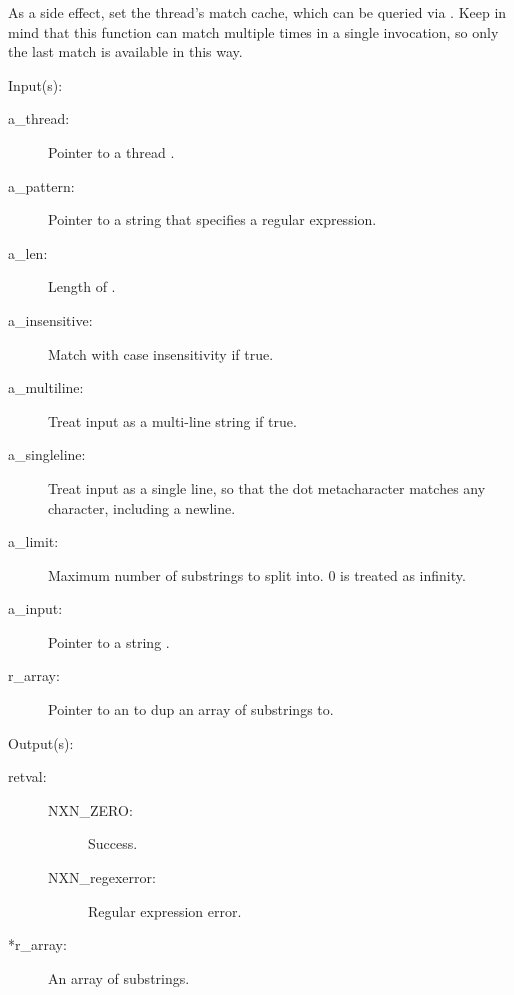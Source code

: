\begin{capi}
\begin{capilist}
		As a side effect, set the thread's match cache, which can be
		queried via .  Keep in mind that
		this function can match multiple times in a single invocation,
		so only the last match is available in this way.
	\end{capilist}
\label{nxo_regex_nonew_split}
	\begin{capilist}
	\item[Input(s): ]
		\begin{description}\item[]
		\item[a\_thread: ]
			Pointer to a thread .
		\item[a\_pattern: ]
			Pointer to a string that specifies a regular expression.
		\item[a\_len: ]
			Length of .
		\item[a\_insensitive: ]
			Match with case insensitivity if true.
		\item[a\_multiline: ]
			Treat input as a multi-line string if true.
		\item[a\_singleline: ]
			Treat input as a single line, so that the dot
			metacharacter matches any character, including a
			newline.
		\item[a\_limit: ]
			Maximum number of substrings to split 
			into.  0 is treated as infinity.
		\item[a\_input: ]
			Pointer to a string .
		\item[r\_array: ]
			Pointer to an  to dup an array of
			substrings to.
		\end{description}
	\item[Output(s): ]
		\begin{description}\item[]
		\item[retval: ]
			\begin{description}\item[]
			\item[NXN\_ZERO: ] Success.
			\item[NXN\_regexerror: ] Regular expression error.
			\end{description}
		\item[*r\_array: ] An array of substrings.

\end{description}
\end{capilist}
\end{capi}
